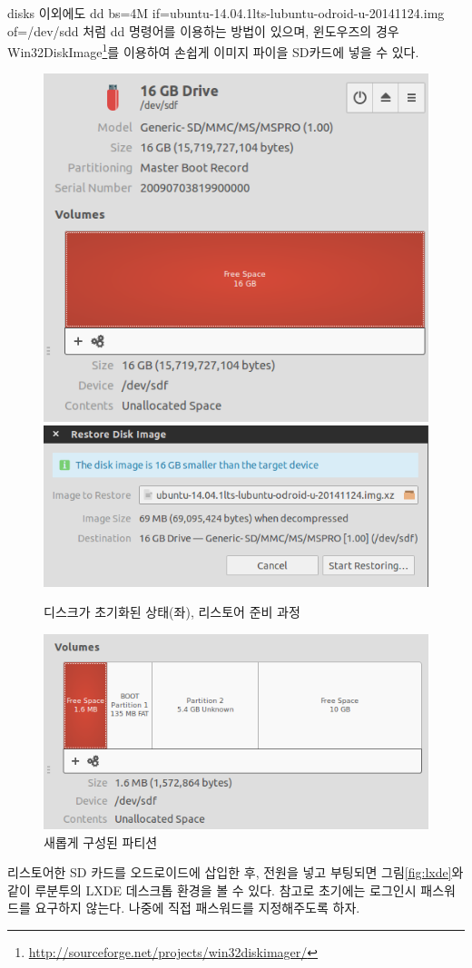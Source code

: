 \begin{exercise}
disks 이외에도 dd bs=4M if=ubuntu-14.04.1lts-lubuntu-odroid-u-20141124.img of=/dev/sdd 처럼 dd 명령어를 이용하는 방법이 있으며, 윈도우즈의 경우 Win32DiskImage\footnote{\url{http://sourceforge.net/projects/win32diskimager/}}를 이용하여 손쉽게 이미지 파이을 SD카드에 넣을 수 있다.
\end{exercise}

\begin{figure}[h]
\centering
\includegraphics[width=0.49\columnwidth]{pictures/chapter3/odroid_sd.png}
\includegraphics[width=0.49\columnwidth]{pictures/chapter3/odroid_restore.png}
\caption{디스크가 초기화된 상태(좌), 리스토어 준비 과정}
\label{fig:partition_restore}
\end{figure}


\begin{figure}[h]
\centering
\includegraphics[width=0.6\columnwidth]{pictures/chapter3/odroid_partition3.png}
\caption{새롭게 구성된 파티션}
\label{fig:lubuntu_partition_new}
\end{figure}

리스토어한 SD 카드를 오드로이드에 삽입한 후, 전원을 넣고 부팅되면 그림\ref{fig:lxde}와 같이 루분투의 LXDE 데스크톱 환경을 볼 수 있다. 참고로 초기에는 로그인시 패스워드를 요구하지 않는다. 나중에 직접 패스워드를 지정해주도록 하자.

